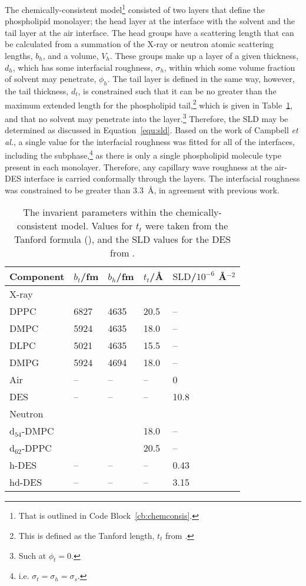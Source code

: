 The chemically-consistent model\footnote{That is outlined in Code Block~\ref{cb:chemconsis}.} consisted of two layers that define the phospholipid monolayer; the head layer at the interface with the solvent and the tail layer at the air interface.
The head groups have a scattering length that can be calculated from a summation of the X-ray or neutron atomic scattering lengths, $b_h$, and a volume, $V_h$.
These groups make up a layer of a given thickness, $d_h$, which has some interfacial roughness, $\sigma_h$, within which some volume fraction of solvent may penetrate, $\phi_h$.
The tail layer is defined in the same way, however, the tail thickness, $d_t$, is constrained such that it can be no greater than the maximum extended length for the phospholipid tail,\footnote{This is defined as the Tanford length, $t_t$ from \cite{tanford_hydrophobic_1980}.} which is given in Table~\ref{tab:invar}, and that no solvent may penetrate into the layer.\footnote{Such at $\phi_t=0$.}
Therefore, the $\text{SLD}$ may be determined as discussed in Equation~\ref{equ:sld}.
Based on the work of Campbell \emph{et al.},\autocite{campbell_structure_2018} a single value for the interfacial roughness was fitted for all of the interfaces, including the subphase,\footnote{i.e. $\sigma_t = \sigma_h = \sigma_s$.} as there is only a single phospholipid molecule type present in each monolayer.
Therefore, any capillary wave roughness at the air-DES interface is carried conformally through the layers.
The interfacial roughness was constrained to be greater than \SI{3.3}{\angstrom}, in agreement with previous work.\autocite{sanchez-fernandez_micellization_2016}
%
\begin{table}
    \centering
  \small
    \caption{The invarient parameters within the chemically-consistent model. Values for $t_t$ were taken from the Tanford formula (\cite{tanford_hydrophobic_1980}), and the SLD values for the DES from \cite{sanchez-fernandez_micellization_2016}.}
    \label{tab:invar}
    \begin{tabular}{l | l l l | l}
        \toprule
        Component & $b_t$/\si{\femto\meter} & $b_h$/\si{\femto\meter} & $t_t$/\AA & $\text{SLD}$/$10^{-6}$ \AA$^{-2}$ \\
        \midrule
    X-ray & & & & \\
        DPPC & 6827 & 4635 & 20.5 & -- \\
        DMPC & 5924 & 4635 & 18.0 & -- \\
        DLPC & 5021 & 4635 & 15.5 & -- \\
        DMPG & 5924 & 4694 & 18.0 & -- \\
        Air & -- & -- & -- & 0 \\
        DES & -- & -- & -- & 10.8 \\
        \midrule
        Neutron & & & & \\
        d$_{54}$-DMPC & & & 18.0 & -- \\
        d$_{62}$-DPPC & & & 20.5 & -- \\
        h-DES & -- & -- & -- & 0.43 \\
        hd-DES & -- & -- & -- & 3.15 \\
        \bottomrule
    \end{tabular}
\end{table}
%

